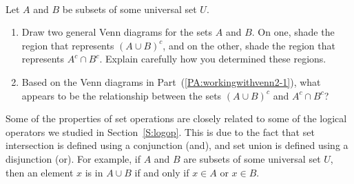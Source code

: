 \begin{previewactivity} \label{PA:workingwithvenn2} \hfill \\
Let $A$ and $B$ be subsets of some universal set $U$.

\begin{enumerate}
\item Draw two general Venn diagrams for the sets  $A$  and  $B$.  On one, shade the region that represents  $\left( {A \cup B} \right)^c $, and on the other, shade the region that represents  $A^c  \cap B^c $.  Explain carefully how you determined these regions. 
\label{PA:workingwithvenn2-1}%

\item Based on the Venn diagrams in Part~(\ref{PA:workingwithvenn2-1}), what appears to be the relationship between the sets   $\left( {A \cup B} \right)^c $ and   $A^c  \cap B^c $?

%

\end{enumerate}
Some of the properties of set operations are closely related to some of the logical operators we studied in Section~\ref{S:logop}.  This is due to the fact that set intersection is defined using a conjunction (and), and set union is defined using a disjunction (or).  For example, if  $A$  and  $B$ are subsets of some universal set  $U$, then an element  $x$  is in  $A \cup B$  if and only if  $x \in A$  or  $x \in B$.


%


\end{previewactivity}
